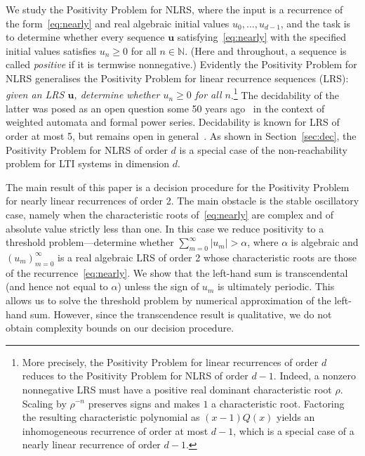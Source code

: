 \documentclass[a4paper,UKenglish,cleveref, autoref, thm-restate]{lipics-v2021}
\begin{document}
We study the Positivity Problem for NLRS, where the input is a
recurrence of the form~\eqref{eq:nearly} 
and real algebraic initial values $u_0,\ldots,u_{d-1}$, and the task is
to determine whether every sequence $\boldsymbol u$
satisfying~\eqref{eq:nearly} with the specified initial values
satisfies $u_n \geq 0$ for all $n\in\mathbb N$. (Here and throughout, a sequence is called \emph{positive} if it is termwise 
nonnegative.)
Evidently the
Positivity Problem for NLRS generalises the Positivity Problem for
linear recurrence sequences (LRS): \emph{given an LRS $\boldsymbol u$,
  determine whether $u_n\geq 0$ for all $n$}.\footnote{More precisely, the 
  Positivity Problem for linear recurrences of order $d$ reduces to
  the Positivity Problem for NLRS of order $d-1$.  Indeed, a nonzero nonnegative LRS must have 
  a positive real dominant characteristic root $\rho$.  Scaling by $\rho^{-n}$ preserves signs and makes $1$
  a characteristic root. Factoring the resulting characteristic polynomial
  as $(x-1)Q(x)$ yields an inhomogeneous recurrence of order at most $d-1$, which is a special case 
  of a nearly linear recurrence of order $d-1$.}  The decidability of the latter
was posed as an open question some 50 years ago~\cite[Section
II.12]{SalomaaSoittola1978} in the context of weighted automata and
formal power series.  
Decidability is known for LRS of order at most 5, but remains open in
general~\cite{OuaknineW14}.  
As shown in Section~\ref{sec:dec}, the Positivity Problem for NLRS of order $d$ is a special case of the
non-reachability problem for LTI systems in
dimension $d$.

The main result of this paper is a decision procedure for the
Positivity Problem for nearly linear recurrences of order 2. 
The main obstacle is the stable oscillatory case, namely when the characteristic roots of~\eqref{eq:nearly}
are complex and of absolute value strictly less than one.
In this case we reduce positivity to a threshold problem---determine  whether $\sum_{m=0}^\infty |u_m|>\alpha$, where $\alpha$ is algebraic and
 $(u_m)_{m=0}^\infty$ is a real algebraic LRS of order 2 whose characteristic roots are those of the recurrence~\eqref{eq:nearly}.
We show that the left-hand sum is transcendental (and hence not equal to $\alpha$) unless 
the sign of $u_m$ is ultimately periodic.  This allows us to solve the threshold problem by numerical approximation of the left-hand sum.
However, since the transcendence result is qualitative, we do not obtain complexity bounds on our 
decision procedure.
\end{document}
